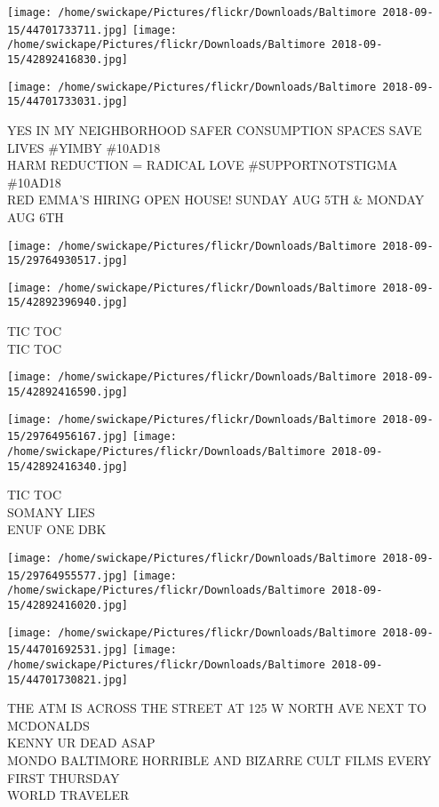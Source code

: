\documentclass[10pt,letterpaper]{article}
\begin{document}
\texttt{[image: /home/swickape/Pictures/flickr/Downloads/Baltimore 2018-09-15/44701733711.jpg]}
\texttt{[image: /home/swickape/Pictures/flickr/Downloads/Baltimore 2018-09-15/42892416830.jpg]}

\texttt{[image: /home/swickape/Pictures/flickr/Downloads/Baltimore 2018-09-15/44701733031.jpg]}

YES IN MY NEIGHBORHOOD SAFER CONSUMPTION SPACES SAVE LIVES \#YIMBY \#10AD18\\
HARM REDUCTION = RADICAL LOVE \#SUPPORTNOTSTIGMA \#10AD18\\
RED EMMA'S HIRING OPEN HOUSE!   SUNDAY AUG 5TH \& MONDAY AUG 6TH
\pagebreak

\texttt{[image: /home/swickape/Pictures/flickr/Downloads/Baltimore 2018-09-15/29764930517.jpg]}

\vspace{0.25in}
\texttt{[image: /home/swickape/Pictures/flickr/Downloads/Baltimore 2018-09-15/42892396940.jpg]}

TIC TOC\\
TIC TOC
\pagebreak

\texttt{[image: /home/swickape/Pictures/flickr/Downloads/Baltimore 2018-09-15/42892416590.jpg]}

\vspace{0.25in}
\texttt{[image: /home/swickape/Pictures/flickr/Downloads/Baltimore 2018-09-15/29764956167.jpg]}
\texttt{[image: /home/swickape/Pictures/flickr/Downloads/Baltimore 2018-09-15/42892416340.jpg]}

TIC TOC\\
SOMANY LIES\\
ENUF ONE DBK
\pagebreak

\texttt{[image: /home/swickape/Pictures/flickr/Downloads/Baltimore 2018-09-15/29764955577.jpg]}
\texttt{[image: /home/swickape/Pictures/flickr/Downloads/Baltimore 2018-09-15/42892416020.jpg]}

\texttt{[image: /home/swickape/Pictures/flickr/Downloads/Baltimore 2018-09-15/44701692531.jpg]}
\texttt{[image: /home/swickape/Pictures/flickr/Downloads/Baltimore 2018-09-15/44701730821.jpg]}

THE ATM IS ACROSS THE STREET AT 125 W NORTH AVE NEXT TO MCDONALDS\\
KENNY UR DEAD ASAP\\
MONDO BALTIMORE HORRIBLE AND BIZARRE CULT FILMS EVERY FIRST THURSDAY\\
WORLD TRAVELER
\pagebreak
\end{document}
